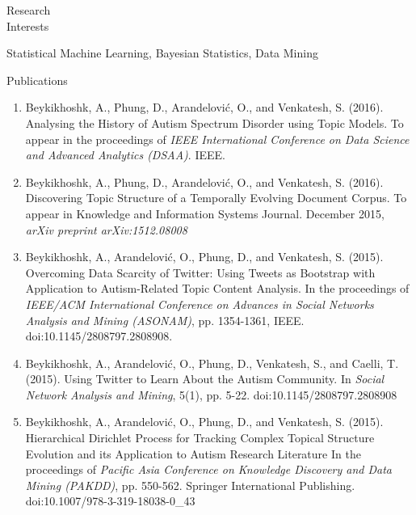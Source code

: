 \documentclass[10pt,letterpaper]{article}
\renewenvironment{itemize}{
  \begin{list}{}{
    \setlength{\leftmargin}{1.5em}
    \setlength{\itemsep}{0.25em}
    \setlength{\parskip}{0pt}
    \setlength{\parsep}{0.25em}
  }
}{
  \end{list}
}
\begin{document}
\bigskip
\bigskip

\begin{minipage}[t]{0.195\textwidth}
Research \\
Interests
\end{minipage}
\begin{minipage}[t]{0.795\textwidth}
\begin{itemize}
\item Statistical Machine Learning, Bayesian Statistics, Data Mining
\end{itemize}
\end{minipage}

\bigskip
\bigskip

\begin{minipage}[t]{0.195\textwidth}
Publications 
\end{minipage}
\begin{minipage}[t]{0.795\textwidth}
\begin{enumerate}

\item Beykikhoshk, A., Phung, D., Arandelovi{\'c}, O., and Venkatesh, S. (2016). Analysing 
the History of Autism Spectrum Disorder using Topic Models. To appear in the proceedings 
of \textit{IEEE International Conference on Data Science and Advanced Analytics (DSAA)}. IEEE.

\item Beykikhoshk, A., Phung, D., Arandelovi{\'c}, O., and Venkatesh, S. (2016). Discovering 
Topic Structure of a Temporally Evolving Document Corpus. To appear in Knowledge and Information 
Systems Journal. December 2015, \textit{arXiv preprint arXiv:1512.08008}

\item Beykikhoshk, A., Arandelovi{\'c}, O., Phung, D., and Venkatesh, S. (2015). Overcoming Data 
Scarcity of Twitter: Using Tweets as Bootstrap with Application to Autism-Related Topic Content Analysis. 
In the proceedings of \textit{IEEE/ACM International Conference on Advances in Social Networks Analysis 
and Mining (ASONAM)}, pp. 1354-1361, IEEE. doi:10.1145/2808797.2808908. 

\item Beykikhoshk, A., Arandelovi{\'c}, O., Phung, D., Venkatesh, S., and Caelli, T. (2015). Using Twitter 
to Learn About the Autism Community.  In \textit{Social Network Analysis and Mining}, 5(1), pp. 5-22. doi:10.1145/2808797.2808908

\item Beykikhoshk, A., Arandelovi{\'c}, O., Phung, D., and Venkatesh, S. (2015). Hierarchical Dirichlet 
Process for Tracking Complex Topical Structure Evolution and its Application to Autism Research Literature 
In the proceedings of \textit{Pacific Asia Conference on Knowledge Discovery and Data Mining (PAKDD)}, 
pp. 550-562. Springer International Publishing. doi:10.1007/978-3-319-18038-0\_43 


\end{enumerate}
\end{minipage}
\end{document}
